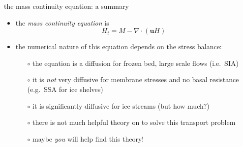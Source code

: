 \begin{frame}{the mass continuity equation: a summary}

\begin{itemize}
\item the \emph{mass continuity equation} is
  $$H_t = M - \nabla \cdot (\mathbf{u} H)$$
\item the numerical nature of this equation depends on the stress balance:
  \begin{itemize}
  \item[$\circ$] the equation is a diffusion for frozen bed, large scale flows (i.e.~SIA)
  \item[$\circ$] it is \emph{not} very diffusive for membrane stresses and no basal resistance (e.g.~SSA for ice shelves)
  \item[$\circ$] it is significantly diffusive for ice streams (but how much?)
  \item[$\circ$] there is not much helpful theory on to solve this transport problem
  \item[$\circ$] maybe \emph{you} will help find this theory!
  \end{itemize}
\end{itemize}
\end{frame}

